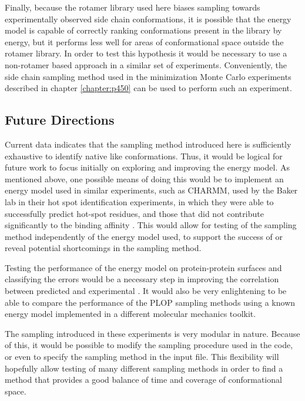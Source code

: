 Finally, because the rotamer library used here biases sampling towards experimentally observed side chain conformations, it is possible that the energy model is capable of correctly ranking conformations present in the library by energy, but it performs less well for areas of conformational space outside the rotamer library.
In order to test this hypothesis it would be necessary to use a non-rotamer based approach in a similar set of experiments.
Conveniently, the side chain sampling method used in the minimization Monte Carlo experiments described in chapter \ref{chapter:p450} can be used to perform such an experiment.

\subsection{Future Directions}
Current data indicates that the sampling method introduced here is sufficiently exhaustive to identify native like conformations.
Thus, it would be logical for future work to focus initially on exploring and improving the energy model.
As mentioned above, one possible means of doing this would be to implement an energy model used in similar experiments, such as CHARMM, used by the Baker lab in their hot spot identification experiments, in which they were able to successfully predict hot-spot residues, and those that did not contribute significantly to the binding affinity \cite{kortemme2004computational,lazaridis1999effective}.
This would allow for testing of the sampling method independently of the energy model used, to support the success of or reveal potential shortcomings in the sampling method.

Testing the performance of the energy model on protein-protein surfaces and classifying the errors would be a necessary step in improving the correlation between predicted and experimental \ddg.
It would also be very enlightening to be able to compare the performance of the PLOP sampling methods using a known energy model implemented in a different molecular mechanics toolkit.

The sampling introduced in these experiments is very modular in nature.
Because of this, it would be possible to modify the sampling procedure used in the code, or even to specify the sampling method in the input file.
This flexibility will hopefully allow testing of many different sampling methods in order to find a method that provides a good balance of time and coverage of conformational space.

